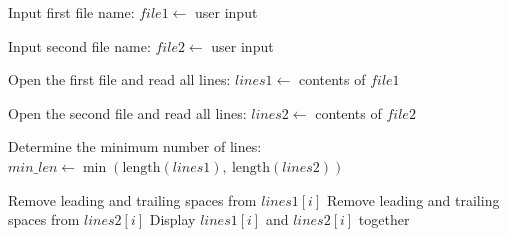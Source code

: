 \begin{algorithm}
\caption{Combine Corresponding Lines from Two Files}
\begin{algorithmic}[1]

\STATE Input first file name:
\STATE $file1 \gets$ user input

\STATE Input second file name:
\STATE $file2 \gets$ user input

\STATE Open the first file and read all lines:
\STATE $lines1 \gets$ contents of $file1$

\STATE Open the second file and read all lines:
\STATE $lines2 \gets$ contents of $file2$

\STATE Determine the minimum number of lines:
\STATE $min\_len \gets \min(\text{length}(lines1),\ \text{length}(lines2))$

    \STATE Remove leading and trailing spaces from $lines1[i]$
    \STATE Remove leading and trailing spaces from $lines2[i]$
    \STATE Display $lines1[i]$ and $lines2[i]$ together
\ENDFOR

\end{algorithmic}
\end{algorithm}
